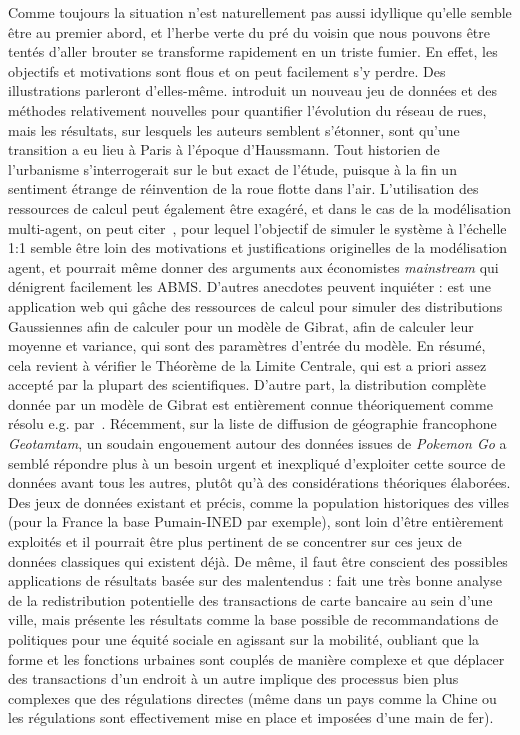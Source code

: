 {}{
Comme toujours la situation n'est naturellement pas aussi idyllique qu'elle semble être au premier abord, et l'herbe verte du pré du voisin que nous pouvons être tentés d'aller brouter se transforme rapidement en un triste fumier. En effet, les objectifs et motivations sont flous et on peut facilement s'y perdre. Des illustrations parleront d'elles-même. \cite{barthelemy2013self} introduit un nouveau jeu de données et des méthodes relativement nouvelles pour quantifier l'évolution du réseau de rues, mais les résultats, sur lesquels les auteurs semblent s'étonner, sont qu'une transition a eu lieu à Paris à l'époque d'Haussmann. Tout historien de l'urbanisme s'interrogerait sur le but exact de l'étude, puisque à la fin un sentiment étrange de réinvention de la roue flotte dans l'air. L'utilisation des ressources de calcul peut également être exagéré, et dans le cas de la modélisation multi-agent, on peut citer~\cite{axtell2016120}, pour lequel l'objectif de simuler le système à l'échelle 1:1 semble être loin des motivations et justifications originelles de la modélisation agent, et pourrait même donner des arguments aux économistes \emph{mainstream} qui dénigrent facilement les ABMS. D'autres anecdotes peuvent inquiéter : %
est une application web qui gâche des ressources de calcul  pour simuler des distributions Gaussiennes afin de calculer pour un modèle de Gibrat, afin de calculer leur moyenne et variance, qui sont des paramètres d'entrée du modèle. En résumé, cela revient à vérifier le Théorème de la Limite Centrale, qui est a priori assez accepté par la plupart des scientifiques. D'autre part, la distribution complète donnée par un modèle de Gibrat est entièrement connue théoriquement comme résolu e.g. par~\cite{gabaix1999zipf}. Récemment, sur la liste de diffusion de géographie francophone \emph{Geotamtam}, un soudain engouement autour des données issues de \emph{Pokemon Go} a semblé répondre plus à un besoin urgent et inexpliqué d'exploiter cette source de données avant tous les autres, plutôt qu'à des considérations théoriques élaborées. Des jeux de données existant et précis, comme la population historiques des villes (pour la France la base Pumain-INED par exemple), sont loin d'être entièrement exploités et il pourrait être plus pertinent de se concentrer sur ces jeux de données classiques qui existent déjà. De même, il faut être conscient des possibles applications de résultats basée sur des malentendus : \cite{louail2016crowdsourcing} fait une très bonne analyse de la redistribution potentielle des transactions de carte bancaire au sein d'une ville, mais présente les résultats comme la base possible de recommandations de politiques pour une équité sociale en agissant sur la mobilité, oubliant que la forme et les fonctions urbaines sont couplés de manière complexe et que déplacer des transactions d'un endroit à un autre implique des processus bien plus complexes que des régulations directes (même dans un pays comme la Chine ou les régulations sont effectivement mise en place et imposées d'une main de fer).
}




